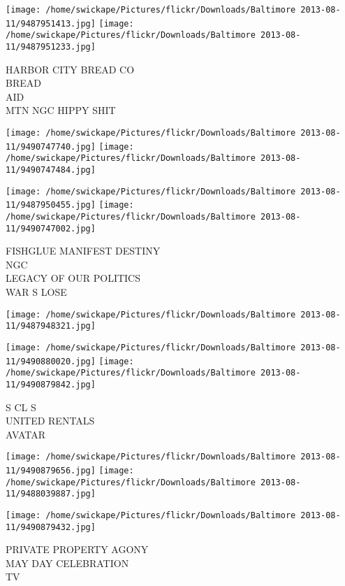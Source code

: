 \documentclass[10pt,letterpaper]{article}
\begin{document}
\texttt{[image: /home/swickape/Pictures/flickr/Downloads/Baltimore 2013-08-11/9487951413.jpg]}
\texttt{[image: /home/swickape/Pictures/flickr/Downloads/Baltimore 2013-08-11/9487951233.jpg]}

HARBOR CITY BREAD CO\\
BREAD\\
AID\\
MTN NGC HIPPY SHIT\\
\pagebreak

\texttt{[image: /home/swickape/Pictures/flickr/Downloads/Baltimore 2013-08-11/9490747740.jpg]}
\texttt{[image: /home/swickape/Pictures/flickr/Downloads/Baltimore 2013-08-11/9490747484.jpg]}

\texttt{[image: /home/swickape/Pictures/flickr/Downloads/Baltimore 2013-08-11/9487950455.jpg]}
\texttt{[image: /home/swickape/Pictures/flickr/Downloads/Baltimore 2013-08-11/9490747002.jpg]}

FISHGLUE MANIFEST DESTINY\\
NGC\\
LEGACY OF OUR POLITICS\\
WAR S LOSE\\
\pagebreak

\texttt{[image: /home/swickape/Pictures/flickr/Downloads/Baltimore 2013-08-11/9487948321.jpg]}

\vspace{0.25in}
\texttt{[image: /home/swickape/Pictures/flickr/Downloads/Baltimore 2013-08-11/9490880020.jpg]}
\texttt{[image: /home/swickape/Pictures/flickr/Downloads/Baltimore 2013-08-11/9490879842.jpg]}

S CL S\\
UNITED RENTALS\\
AVATAR\\
\pagebreak

\texttt{[image: /home/swickape/Pictures/flickr/Downloads/Baltimore 2013-08-11/9490879656.jpg]}
\texttt{[image: /home/swickape/Pictures/flickr/Downloads/Baltimore 2013-08-11/9488039887.jpg]}

\texttt{[image: /home/swickape/Pictures/flickr/Downloads/Baltimore 2013-08-11/9490879432.jpg]}

PRIVATE PROPERTY AGONY\\
MAY DAY CELEBRATION\\
TV\\
\pagebreak
\end{document}
